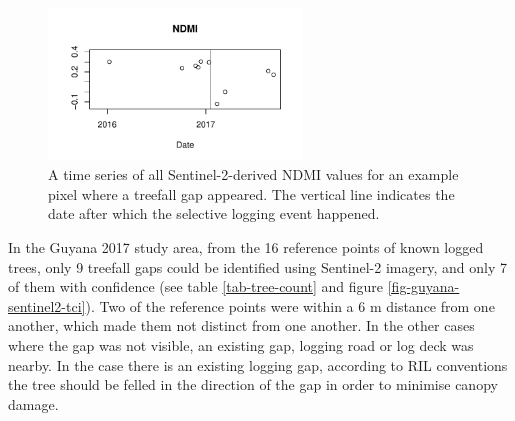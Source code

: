 \documentclass[a4paper,12pt]{scrbook}
\begin{document}
\begin{table}
    \caption{Summary of known logged tree locations and identified treefall gaps. Trees with known logging date are trees with records of dates both before and after logging (the others were missing either one of the two dates). High confidence for gap identification means that at least two vegetation indices indicated a change and the change was persistent at least in two subsequent images right after the logging date.}
    \label{tab-tree-count}
\end{table}

\begin{figure}
  \centering
  \includegraphics[width=0.6\textwidth]{thesis-figures/08-guyana-ts-ndmi}
  \caption{A time series of all Sentinel-2-derived \ac{NDMI} values for an example pixel where a treefall gap appeared. The vertical line indicates the date after which the selective logging event happened.}
  \label{fig-guyana-ts-ndmi}
\end{figure}

In the Guyana 2017 study area, from the 16 reference points of known logged trees, only 9 treefall gaps could be identified using Sentinel-2 imagery, and only 7 of them with confidence (see table \ref{tab-tree-count} and figure \ref{fig-guyana-sentinel2-tci}). Two of the reference points were within a 6 m distance from one another, which made them not distinct from one another. In the other cases where the gap was not visible, an existing gap, logging road or log deck was nearby. In the case there is an existing logging gap, according to \ac{RIL} conventions the tree should be felled in the direction of the gap in order to minimise canopy damage.
\end{document}
